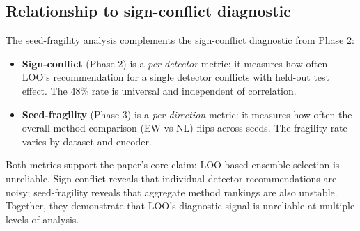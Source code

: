 \subsection{Relationship to sign-conflict diagnostic}

The seed-fragility analysis complements the sign-conflict diagnostic from Phase 2:

\begin{itemize}
\item \textbf{Sign-conflict} (Phase 2) is a \emph{per-detector} metric: it measures how often LOO's recommendation for a single detector conflicts with held-out test effect. The 48\% rate is universal and independent of correlation.
\item \textbf{Seed-fragility} (Phase 3) is a \emph{per-direction} metric: it measures how often the overall method comparison (EW vs NL) flips across seeds. The fragility rate varies by dataset and encoder.
\end{itemize}

Both metrics support the paper's core claim: LOO-based ensemble selection is unreliable. Sign-conflict reveals that individual detector recommendations are noisy; seed-fragility reveals that aggregate method rankings are also unstable. Together, they demonstrate that LOO's diagnostic signal is unreliable at multiple levels of analysis.
